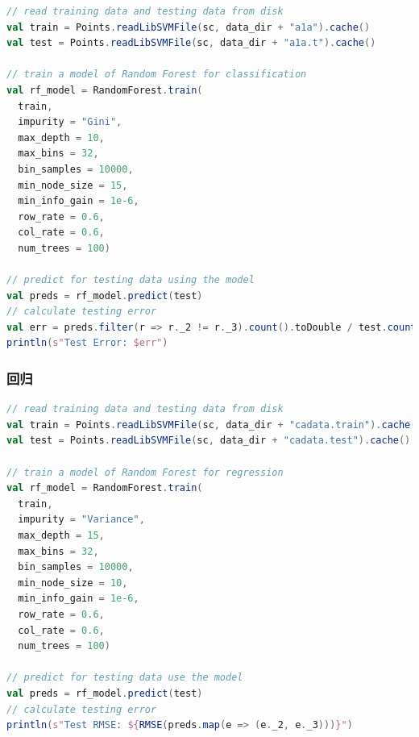 \documentclass[a4paper,11pt,         %
               ]{article}
\begin{document}
{\begin{lstlisting}[language={SCALA},title={RunRandomForestForClassification.scala}]  
// read training data and testing data from disk
val train = Points.readLibSVMFile(sc, data_dir + "a1a").cache()
val test = Points.readLibSVMFile(sc, data_dir + "a1a.t").cache()

// train a model of Random Forest for classification
val rf_model = RandomForest.train(
  train,
  impurity = "Gini",
  max_depth = 10,
  max_bins = 32,
  bin_samples = 10000,
  min_node_size = 15,
  min_info_gain = 1e-6,
  row_rate = 0.6,
  col_rate = 0.6,
  num_trees = 100)

// predict for testing data using the model
val preds = rf_model.predict(test)
// calculate testing error
val err = preds.filter(r => r._2 != r._3).count().toDouble / test.count()
println(s"Test Error: $err")
\end{lstlisting}  

\subsubsection{回归}

\begin{lstlisting}[language={SCALA},title={RunRandomForestForRegression.scala}]  
// read training data and testing data from disk
val train = Points.readLibSVMFile(sc, data_dir + "cadata.train").cache()
val test = Points.readLibSVMFile(sc, data_dir + "cadata.test").cache()

// train a model of Random Forest for regression
val rf_model = RandomForest.train(
  train,
  impurity = "Variance",
  max_depth = 15,
  max_bins = 32,
  bin_samples = 10000,
  min_node_size = 10,
  min_info_gain = 1e-6,
  row_rate = 0.6,
  col_rate = 0.6,
  num_trees = 100)

// predict for testing data use the model
val preds = rf_model.predict(test)
// calculate testing error
println(s"Test RMSE: ${RMSE(preds.map(e => (e._2, e._3)))}")
\end{lstlisting}  



}
\end{document}

